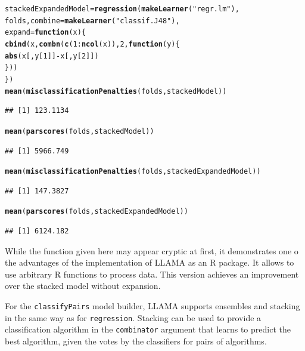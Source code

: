\documentclass{article}\usepackage[]{graphicx}\usepackage[]{color}
\makeatletter
\newcommand{\hlnum}[1]{\textcolor[rgb]{0.686,0.059,0.569}{#1}}%
\newcommand{\hlstr}[1]{\textcolor[rgb]{0.192,0.494,0.8}{#1}}%
\newcommand{\hlopt}[1]{\textcolor[rgb]{0,0,0}{#1}}%
\newcommand{\hlstd}[1]{\textcolor[rgb]{0.345,0.345,0.345}{#1}}%
\newcommand{\hlkwa}[1]{\textcolor[rgb]{0.161,0.373,0.58}{\textbf{#1}}}%
\newcommand{\hlkwb}[1]{\textcolor[rgb]{0.69,0.353,0.396}{#1}}%
\newcommand{\hlkwc}[1]{\textcolor[rgb]{0.333,0.667,0.333}{#1}}%
\newcommand{\hlkwd}[1]{\textcolor[rgb]{0.737,0.353,0.396}{\textbf{#1}}}%
\newenvironment{kframe}{%
 \def\at@end@of@kframe{}%
 \ifinner\ifhmode%
  \def\at@end@of@kframe{\end{minipage}}%
  \begin{minipage}{\columnwidth}%
 \fi\fi%
 \def\FrameCommand##1{\hskip\@totalleftmargin \hskip-\fboxsep
 \colorbox{shadecolor}{##1}\hskip-\fboxsep
     \hskip-\linewidth \hskip-\@totalleftmargin \hskip\columnwidth}%
 \MakeFramed {\advance\hsize-\width
   \@totalleftmargin\z@ \linewidth\hsize
   \@setminipage}}%
 {\par\unskip\endMakeFramed%
 \at@end@of@kframe}
\newenvironment{knitrout}{}{} %
\makeatother
\begin{document}
\begin{knitrout}
\color{fgcolor}\begin{kframe}
\begin{alltt}
\hlstd{stackedExpandedModel} \hlkwb{=} \hlkwd{regression}\hlstd{(}\hlkwd{makeLearner}\hlstd{(}\hlstr{"regr.lm"}\hlstd{),}
    \hlstd{folds,} \hlkwc{combine} \hlstd{=} \hlkwd{makeLearner}\hlstd{(}\hlstr{"classif.J48"}\hlstd{),}
    \hlkwc{expand} \hlstd{=} \hlkwa{function}\hlstd{(}\hlkwc{x}\hlstd{) \{}
        \hlkwd{cbind}\hlstd{(x,} \hlkwd{combn}\hlstd{(}\hlkwd{c}\hlstd{(}\hlnum{1}\hlopt{:}\hlkwd{ncol}\hlstd{(x)),} \hlnum{2}\hlstd{,} \hlkwa{function}\hlstd{(}\hlkwc{y}\hlstd{) \{}
            \hlkwd{abs}\hlstd{(x[, y[}\hlnum{1}\hlstd{]]} \hlopt{-} \hlstd{x[, y[}\hlnum{2}\hlstd{]])}
        \hlstd{\}))}
    \hlstd{\})}
\hlkwd{mean}\hlstd{(}\hlkwd{misclassificationPenalties}\hlstd{(folds, stackedModel))}
\end{alltt}
\begin{verbatim}
## [1] 123.1134
\end{verbatim}
\begin{alltt}
\hlkwd{mean}\hlstd{(}\hlkwd{parscores}\hlstd{(folds, stackedModel))}
\end{alltt}
\begin{verbatim}
## [1] 5966.749
\end{verbatim}
\begin{alltt}
\hlkwd{mean}\hlstd{(}\hlkwd{misclassificationPenalties}\hlstd{(folds, stackedExpandedModel))}
\end{alltt}
\begin{verbatim}
## [1] 147.3827
\end{verbatim}
\begin{alltt}
\hlkwd{mean}\hlstd{(}\hlkwd{parscores}\hlstd{(folds, stackedExpandedModel))}
\end{alltt}
\begin{verbatim}
## [1] 6124.182
\end{verbatim}
\end{kframe}
\end{knitrout}

While the function given here may appear cryptic at first, it demonstrates one o
the advantages of the implementation of LLAMA as an R package. It allows to use
arbitrary R functions to process data. This version achieves an improvement over
the stacked model without expansion.

For the \lstinline{classifyPairs} model builder, LLAMA supports ensembles and
stacking in the same way as for \lstinline{regression}. Stacking can be used to
provide a classification algorithm in the \lstinline{combinator} argument that
learns to predict the best algorithm, given the votes by the classifiers for
pairs of algorithms.
\end{document}
